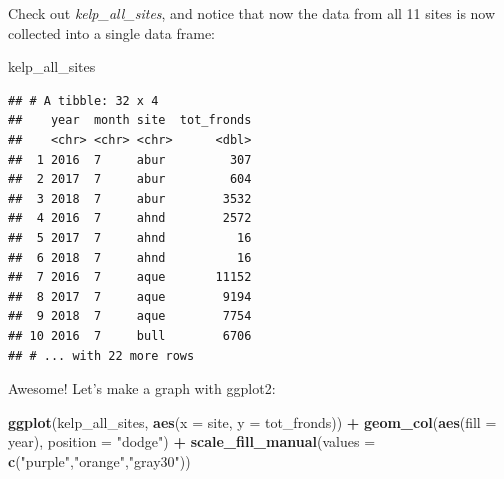 \documentclass[]{book}
\newenvironment{Shaded}{\begin{snugshade}}{\end{snugshade}}
\newcommand{\DataTypeTok}[1]{\textcolor[rgb]{0.13,0.29,0.53}{#1}}
\newcommand{\KeywordTok}[1]{\textcolor[rgb]{0.13,0.29,0.53}{\textbf{#1}}}
\newcommand{\NormalTok}[1]{#1}
\newcommand{\OperatorTok}[1]{\textcolor[rgb]{0.81,0.36,0.00}{\textbf{#1}}}
\newcommand{\StringTok}[1]{\textcolor[rgb]{0.31,0.60,0.02}{#1}}
\begin{document}
\begin{Shaded}
\end{Shaded}

Check out \emph{kelp\_all\_sites}, and notice that now the data from all 11 sites is now collected into a single data frame:

\begin{Shaded}
\begin{Highlighting}[]
\NormalTok{kelp_all_sites}
\end{Highlighting}
\end{Shaded}

\begin{verbatim}
## # A tibble: 32 x 4
##    year  month site  tot_fronds
##    <chr> <chr> <chr>      <dbl>
##  1 2016  7     abur         307
##  2 2017  7     abur         604
##  3 2018  7     abur        3532
##  4 2016  7     ahnd        2572
##  5 2017  7     ahnd          16
##  6 2018  7     ahnd          16
##  7 2016  7     aque       11152
##  8 2017  7     aque        9194
##  9 2018  7     aque        7754
## 10 2016  7     bull        6706
## # ... with 22 more rows
\end{verbatim}

Awesome! Let's make a graph with ggplot2:

\begin{Shaded}
\begin{Highlighting}[]
\KeywordTok{ggplot}\NormalTok{(kelp_all_sites, }\KeywordTok{aes}\NormalTok{(}\DataTypeTok{x =}\NormalTok{ site, }\DataTypeTok{y =}\NormalTok{ tot_fronds)) }\OperatorTok{+}
\StringTok{  }\KeywordTok{geom_col}\NormalTok{(}\KeywordTok{aes}\NormalTok{(}\DataTypeTok{fill =}\NormalTok{ year), }\DataTypeTok{position =} \StringTok{"dodge"}\NormalTok{) }\OperatorTok{+}
\StringTok{  }\KeywordTok{scale_fill_manual}\NormalTok{(}\DataTypeTok{values =} \KeywordTok{c}\NormalTok{(}\StringTok{"purple"}\NormalTok{,}\StringTok{"orange"}\NormalTok{,}\StringTok{"gray30"}\NormalTok{))}
\end{Highlighting}
\end{Shaded}
\end{document}
